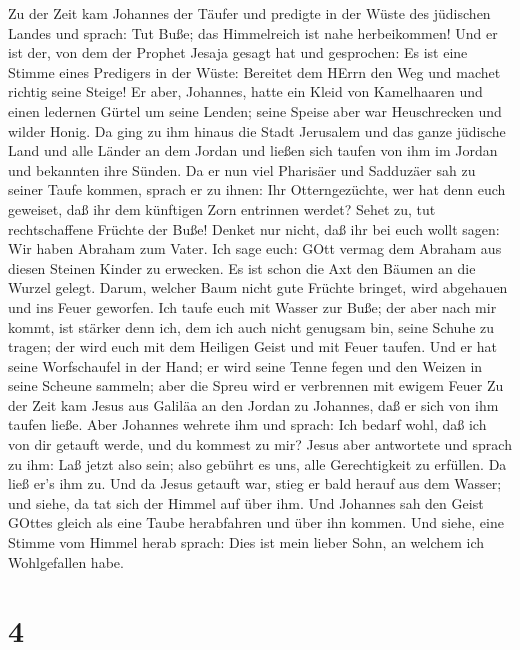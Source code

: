  Zu der Zeit kam Johannes der Täufer und predigte in der
Wüste des jüdischen Landes  und sprach: Tut Buße; das
Himmelreich ist nahe herbeikommen!  Und er ist der, von dem
der Prophet Jesaja gesagt hat und gesprochen: Es ist eine Stimme eines
Predigers in der Wüste: Bereitet dem HErrn den Weg und machet richtig
seine Steige!  Er aber, Johannes, hatte ein Kleid von
Kamelhaaren und einen ledernen Gürtel um seine Lenden; seine Speise aber
war Heuschrecken und wilder Honig.  Da ging zu ihm hinaus
die Stadt Jerusalem und das ganze jüdische Land und alle Länder an dem
Jordan  und ließen sich taufen von ihm im Jordan und
bekannten ihre Sünden.  Da er nun viel Pharisäer und
Sadduzäer sah zu seiner Taufe kommen, sprach er zu ihnen: Ihr
Otterngezüchte, wer hat denn euch geweiset, daß ihr dem künftigen Zorn
entrinnen werdet?  Sehet zu, tut rechtschaffene Früchte der
Buße!  Denket nur nicht, daß ihr bei euch wollt sagen: Wir
haben Abraham zum Vater. Ich sage euch: GOtt vermag dem Abraham aus
diesen Steinen Kinder zu erwecken.  Es ist schon die Axt
den Bäumen an die Wurzel gelegt. Darum, welcher Baum nicht gute Früchte
bringet, wird abgehauen und ins Feuer geworfen.  Ich taufe
euch mit Wasser zur Buße; der aber nach mir kommt, ist stärker denn ich,
dem ich auch nicht genugsam bin, seine Schuhe zu tragen; der wird euch
mit dem Heiligen Geist und mit Feuer taufen.  Und er hat
seine Worfschaufel in der Hand; er wird seine Tenne fegen und den Weizen
in seine Scheune sammeln; aber die Spreu wird er verbrennen mit ewigem
Feuer  Zu der Zeit kam Jesus aus Galiläa an den Jordan zu
Johannes, daß er sich von ihm taufen ließe.  Aber Johannes
wehrete ihm und sprach: Ich bedarf wohl, daß ich von dir getauft werde,
und du kommest zu mir?  Jesus aber antwortete und sprach zu
ihm: Laß jetzt also sein; also gebührt es uns, alle Gerechtigkeit zu
erfüllen. Da ließ er's ihm zu.  Und da Jesus getauft war,
stieg er bald herauf aus dem Wasser; und siehe, da tat sich der Himmel
auf über ihm. Und Johannes sah den Geist GOttes gleich als eine Taube
herabfahren und über ihn kommen.  Und siehe, eine Stimme
vom Himmel herab sprach: Dies ist mein lieber Sohn, an welchem ich
Wohlgefallen habe.

\hypertarget{section-3}{%
\section{4}\label{section-3}}

